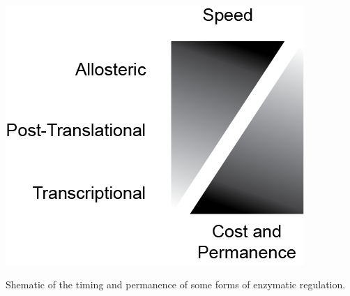 \documentclass{tufte-handout}
\begin{document}
\begin{marginfigure}
\includegraphics{figures/regulation-models.png}
\caption{Shematic of the timing and permanence of some forms of enzymatic regulation.}
\label{fig:regulation-models}
\end{marginfigure}




\end{document}
